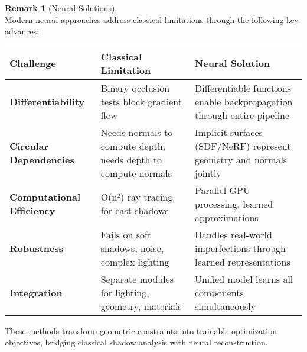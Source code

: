 \documentclass[12pt]{article}
\theoremstyle{definition}
\newtheorem{remark}{Remark}[subsection]
\begin{document}
\newpage

\begin{remark}[Neural Solutions] \label{rmk:neural_solutions} ~\\
Modern neural approaches address classical limitations through the following key advances:

\begin{center}
\begin{tabular}{|l|p{5.5cm}|p{5.5cm}|}
\hline
\textbf{Challenge} & \textbf{Classical Limitation} & \textbf{Neural Solution} \\
\hline
\textbf{Differentiability} & Binary occlusion tests block gradient flow & Differentiable functions enable backpropagation through entire pipeline \\
\hline
\textbf{Circular Dependencies} & Needs normals to compute depth, needs depth to compute normals & Implicit surfaces (SDF/NeRF) represent geometry and normals jointly \\
\hline
\textbf{Computational Efficiency} & O(n²) ray tracing for cast shadows & Parallel GPU processing, learned approximations \\
\hline
\textbf{Robustness} & Fails on soft shadows, noise, complex lighting & Handles real-world imperfections through learned representations \\
\hline
\textbf{Integration} & Separate modules for lighting, geometry, materials & Unified model learns all components simultaneously \\
\hline
\end{tabular}
\end{center}

These methods transform geometric constraints into trainable optimization objectives, bridging classical shadow analysis with neural reconstruction.
\end{remark}



\end{document}
